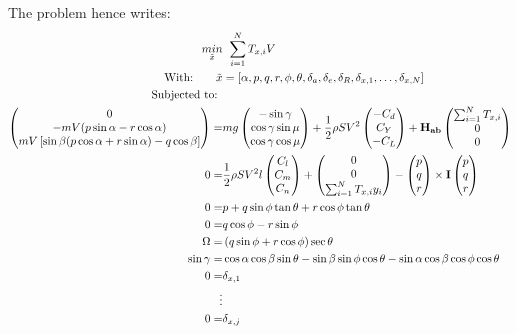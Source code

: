 The problem hence writes:
\begin{align}
\underset{\tilde{x}}{min} & \: \:\sum_{i=1}^{N} T_{x,i} V\\
\text{With:}\qquad \tilde{x}&=[\alpha, p, q, r, \phi, \theta, \delta_a, \delta_e, \delta_R, \delta_{x,1}, \dots, \delta_{x,N}]\\
\text{Subjected to: }&\notag \\
\begin{pmatrix}
0 \\
-mV(p\sin\alpha - r\cos\alpha)\\
mV\left[\sin\beta (p\cos\alpha + r\sin\alpha) - q\cos\beta\right]
\end{pmatrix}
= & mg
\begin{pmatrix}
-\sin\gamma\\
\cos\gamma \sin\mu\\
\cos\gamma \cos\mu	
\end{pmatrix}
+ \frac{1}{2} \rho S V^2
\begin{pmatrix}
-C_d\\
C_Y\\
-C_L
\end{pmatrix}
+ \mathbf{H_{ab}} 
\begin{pmatrix}
\sum_{i=1}^{N} T_{x,i}\\
0\\
0
\end{pmatrix} \\
0 =& \frac{1}{2} \rho S V^2 l
\begin{pmatrix}
C_l\\
C_m\\
C_n
\end{pmatrix}
+
\begin{pmatrix}
0\\
0\\
\sum_{i=1}^{N} T_{x,i} y_i
\end{pmatrix} -
\begin{pmatrix}
p\\
q\\
r
\end{pmatrix}
\times \textbf{I}
\begin{pmatrix}
p\\
q\\
r
\end{pmatrix}\\
0= & p + q\sin\phi \tan\theta + r \cos\phi \tan\theta\\
0= & q\cos\phi -r\sin \phi\\
\Omega = & \left( q \sin \phi + r \cos \phi \right) \sec \theta \\
\sin \gamma = & \cos\alpha\cos\beta\sin\theta - \sin\beta\sin\phi\cos\theta - \sin\alpha\cos\beta\cos\phi\cos\theta\\
0 = & \delta_{x,1}\\
\vdots\notag\\
0 = & \delta_{x,j}
\end{align}

